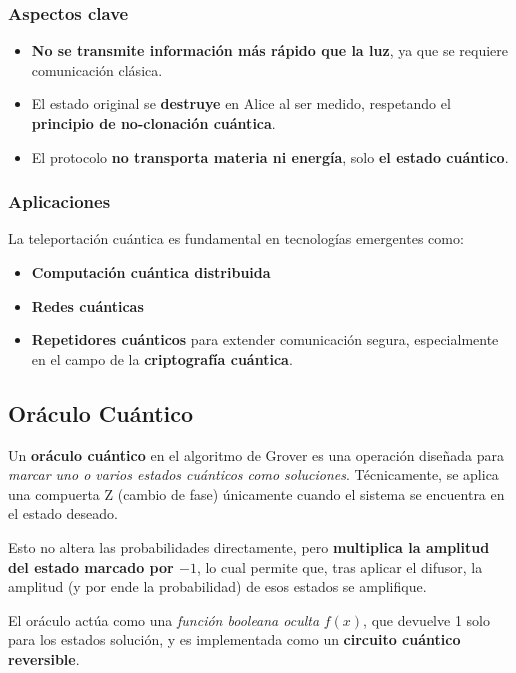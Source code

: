 \documentclass{article}
\begin{document}
\subsubsection*{Aspectos clave}

\begin{itemize}
    \item \textbf{No se transmite información más rápido que la luz}, ya que se requiere comunicación clásica.
    \item El estado original se \textbf{destruye} en Alice al ser medido, respetando el \textbf{principio de no-clonación cuántica}.
    \item El protocolo \textbf{no transporta materia ni energía}, solo \textbf{el estado cuántico}.
\end{itemize}

\subsubsection*{Aplicaciones}

La teleportación cuántica es fundamental en tecnologías emergentes como:

\begin{itemize}
    \item \textbf{Computación cuántica distribuida}
    \item \textbf{Redes cuánticas}
    \item \textbf{Repetidores cuánticos} para extender comunicación segura, especialmente en el campo de la \textbf{criptografía cuántica}.
\end{itemize}


\subsection*{Oráculo Cuántico}

Un \textbf{oráculo cuántico} en el algoritmo de Grover es una operación diseñada 
para \textit{marcar uno o varios estados cuánticos como soluciones}. Técnicamente, se aplica una 
compuerta Z (cambio de fase) únicamente cuando el sistema se encuentra en el estado deseado.

Esto no altera las probabilidades directamente, pero 
\textbf{multiplica la amplitud del estado marcado por $-1$}, lo cual permite que, tras aplicar 
el difusor, la amplitud (y por ende la probabilidad) de esos estados se amplifique.

El oráculo actúa como una \textit{función booleana oculta} $f(x)$, que devuelve 1 solo para 
los estados solución, y es implementada como un \textbf{circuito cuántico reversible}.
\end{document}
